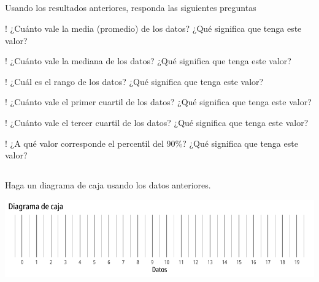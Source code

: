 \documentclass{cdplf-prueba}
\begin{document}
\subsection{}
Usando los resultados anteriores, responda las siguientes preguntas
\begin{tasks}[label={\tcbox[colback=black!60, colframe=black!60, coltext=white, on line, boxsep=0pt, left=3pt, right=3pt, top=2pt, bottom=2pt]{\sffamily\bfseries\alph*}},
item-indent=1.2cm,column-sep=20pt,label-offset=0.3cm,label-width=15pt,after-item-skip=10pt]
    \task! ¿Cuánto vale la media (promedio) de los datos? ¿Qué significa que tenga este valor? \begin{lineas}[height=1.5cm]\end{lineas}
    \task! ¿Cuánto vale la mediana de los datos? ¿Qué significa que tenga este valor? \begin{lineas}[height=1.5cm]\end{lineas}
    \task! ¿Cuál es el rango de los datos? ¿Qué significa que tenga este valor? \begin{lineas}[height=1.5cm]\end{lineas}
    \task! ¿Cuánto vale el primer cuartil de los datos? ¿Qué significa que tenga este valor? \begin{lineas}[height=1.5cm]\end{lineas}
    \task! ¿Cuánto vale el tercer cuartil de los datos? ¿Qué significa que tenga este valor? \begin{lineas}[height=1.5cm]\end{lineas}
    \task! ¿A qué valor corresponde el percentil del 90\%? ¿Qué significa que tenga este valor? \begin{lineas}[height=1.5cm]\end{lineas}
\end{tasks}
\subsection{}

Haga un diagrama de caja usando los datos anteriores.
\begin{center}\includegraphics{diagrama_caja_vacio_3.pdf}\end{center}
\end{document}

